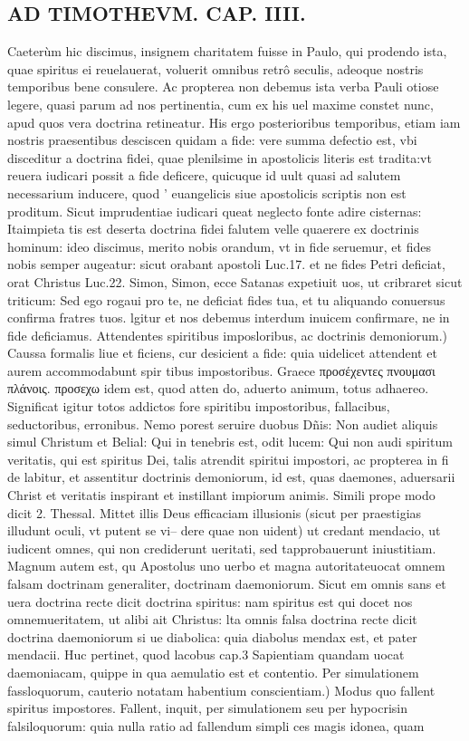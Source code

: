 \documentclass{article}
\begin{document}
\begin{pages}
\section*{AD TIMOTHEVM. CAP. IIII. }
\marginpar{[ p.91 ]}\pstart Caeterùm hic discimus, insignem charitatem fuisse in Paulo, qui prodendo ista, quae spiritus ei reuelauerat, voluerit omnibus retrô seculis, adeoque nostris temporibus bene consulere. Ac propterea non debemus ista verba Pauli otiose legere, quasi parum ad nos pertinentia, cum ex his uel maxime constet nunc, apud quos vera doctrina retineatur. His ergo posterioribus temporibus, etiam iam nostris praesentibus desciscen quidam a fide: vere summa defectio est, vbi disceditur a doctrina fidei, quae plenilsime in apostolicis literis est tradita:vt reuera iudicari possit a fide deficere, quicuque id uult quasi ad salutem necessarium inducere, quod ' euangelicis siue apostolicis scriptis non est proditum. Sicut imprudentiae iudicari queat neglecto fonte adire cisternas: Itaimpieta tis est deserta doctrina fidei falutem velle quaerere ex doctrinis hominum: ideo discimus, merito nobis orandum, vt in fide seruemur, et fides nobis semper augeatur: sicut orabant apostoli Luc.17. et ne fides Petri deficiat, orat Christus Luc.22. Simon, Simon, ecce Satanas expetiuit uos, ut cribraret sicut triticum: Sed ego rogaui pro te, ne deficiat fides tua, et tu aliquando conuersus confirma fratres tuos. lgitur et nos debemus interdum inuicem confirmare, ne in fide deficiamus.  \pend\pstart Attendentes spiritibus imposloribus, ac doctrinis demoniorum.) Caussa formalis liue et ficiens, cur desicient a fide: quia uidelicet attendent et aurem accommodabunt spir tibus impostoribus. Graece προσέχεντες πνουμασι πλάνοις. προσεχω idem est, quod atten do, aduerto animum, totus adhaereo. Significat igitur totos addictos fore spiritibu impostoribus, fallacibus, seductoribus, erronibus. Nemo porest seruire duobus Dñis: Non audiet aliquis simul Christum et Belial: Qui in tenebris est, odit lucem: Qui non audi spiritum veritatis, qui est spiritus Dei, talis atrendit spiritui impostori, ac propterea in fi de labitur, et assentitur doctrinis demoniorum, id est, quas daemones, aduersarii Christ et veritatis inspirant et instillant impiorum animis. Simili prope modo dicit 2. Thessal. Mittet illis Deus efficaciam illusionis (sicut per praestigias illudunt oculi, vt putent se vi-- dere quae non uident) ut credant mendacio, ut iudicent omnes, qui non crediderunt ueritati, sed tapprobauerunt iniustitiam. Magnum autem est, qu Apostolus uno uerbo et magna autoritateuocat omnem falsam doctrinam generaliter, doctrinam daemoniorum. Sicut em omnis sans et uera doctrina recte dicit doctrina spiritus: nam spiritus est qui docet nos omnemueritatem, ut alibi ait Christus: lta omnis falsa doctrina recte dicit doctrina daemoniorum si ue diabolica: quia diabolus mendax est, et pater mendacii. Huc pertinet, quod lacobus cap.3 Sapientiam quandam uocat daemoniacam, quippe in qua aemulatio est et contentio.  \pend\pstart Per simulationem fassloquorum, cauterio notatam habentium conscientiam.) Modus quo fallent spiritus impostores. Fallent, inquit, per simulationem seu per hypocrisin falsiloquorum: quia nulla ratio ad fallendum simpli ces magis idonea, quam 
\end{pages}
\end{document}
